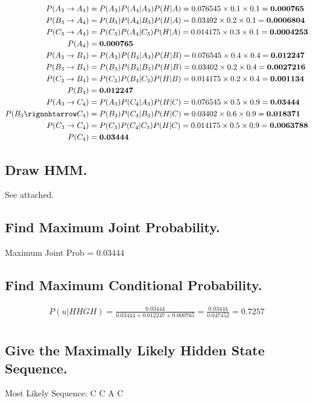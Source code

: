 \documentclass[a4paper]{article}
\begin{document}
\begin{align*}
    P(A_3 \rightarrow A_4) &= P(A_3) P(A_4 | A_3) P(H | A) = 0.076545 \times 0.1 \times 0.1 = \textbf{0.000765}\\
    P(B_3 \rightarrow A_4) &= P(B_3) P(A_4 | B_3) P(H | A) = 0.03402 \times 0.2 \times 0.1 = \textbf{0.0006804}\\
    P(C_3 \rightarrow A_4) &= P(C_3) P(A_4 | C_3) P(H | A) = 0.014175 \times 0.3 \times 0.1 = \textbf{0.0004253}\\
    P(A_4) &= \textbf{0.000765}\\
    P(A_3 \rightarrow B_4) &= P(A_3) P(B_4 | A_3) P(H | B) = 0.076545 \times 0.4 \times 0.4 = \textbf{0.012247}\\
    P(B_3 \rightarrow B_4) &= P(B_3) P(B_4 | B_3) P(H | B) = 0.03402 \times 0.2 \times 0.4 = \textbf{0.0027216} \\
    P(C_3 \rightarrow B_4) &= P(C_3) P(B_4 | C_3) P(H | B) = 0.014175 \times 0.2 \times 0.4 = \textbf{0.001134}\\
    P(B_4) &= \textbf{0.012247}\\
    P(A_3 \rightarrow C_4) &= P(A_3) P(C_4 | A_3) P(H | C) = 0.076545 \times 0.5 \times 0.9 = \textbf{0.03444}\\
    P(B_3 \rignnhtarrow C_4) &= P(B_3) P(C_4 | B_3) P(H | C) = 0.03402 \times 0.6 \times 0.9 = \textbf{0.018371}\\
    P(C_3 \rightarrow C_4) &= P(C_3) P(C_4 | C_3) P(H | C) = 0.014175 \times 0.5 \times 0.9 = \textbf{0.0063788}\\
    P(C_4) &= \textbf{0.03444}\\
\end{align*}
\subsection{Draw HMM.}
\label{sec-5-1}
See attached.
\subsection{Find Maximum Joint Probability.}
\label{sec-5-2}
Maximum Joint Prob = 0.03444\\
\subsection{Find Maximum Conditional Probability.}
\label{sec-5-3}
\begin{align*}
      P(u | HHGH) = \frac{0.03444}{0.03444 + 0.012247 + 0.000765} = \frac{0.03444}{0.047452} = 0.7257\\
\end{align*}
\subsection{Give the Maximally Likely Hidden State Sequence.}
\label{sec-5-4}
Most Likely Sequence: C C A C \\
\end{document}
